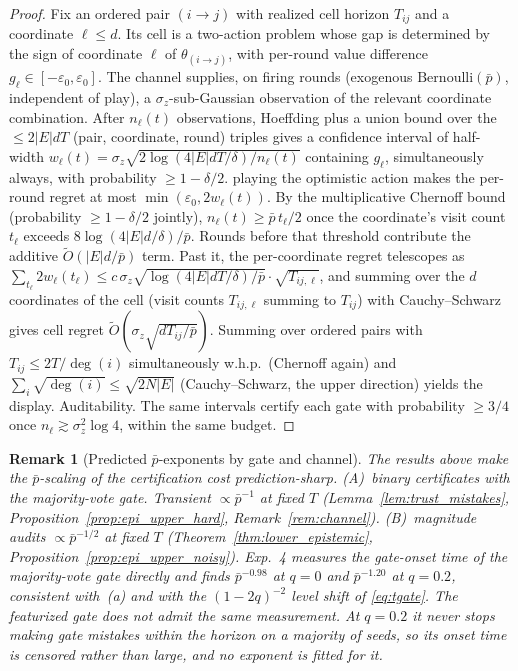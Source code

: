 \documentclass[11pt]{article}
\newtheorem{remark}[theorem]{Remark}
\newcommand{\Ot}{\widetilde{O}}
\begin{document}
\begin{proof}
Fix an ordered pair $(i\to j)$ with realized cell horizon $T_{ij}$ and
a coordinate $\ell\leq d$. Its cell is a two-action problem whose gap
is determined by the sign of coordinate $\ell$ of
$\theta_{(i\to j)}$, with per-round value difference
$g_\ell\in[-\varepsilon_0,\varepsilon_0]$.  The channel supplies, on
firing rounds (exogenous $\mathrm{Bernoulli}(\bar p)$, independent of
play), a $\sigma_z$-sub-Gaussian observation of the relevant
coordinate combination.  After $n_\ell(t)$ observations, Hoeffding
plus a union bound over the $\leq 2|E|dT$ (pair, coordinate, round)
triples gives a confidence interval of half-width
$w_\ell(t)=\sigma_z\sqrt{2\log(4|E|dT/\delta)/n_\ell(t)}$ containing
$g_\ell$, simultaneously always, with probability $\geq1-\delta/2$.
playing the optimistic action makes the per-round regret at most
$\min(\varepsilon_0,2w_\ell(t))$.  By the multiplicative
Chernoff bound (probability $\geq1-\delta/2$ jointly), $n_\ell(t)\geq
\bar p\,t_\ell/2$ once the coordinate's visit count $t_\ell$ exceeds
$8\log(4|E|d/\delta)/\bar p$. Rounds before that threshold contribute
the additive $\Ot(|E|d/\bar p)$ term.  Past it, the per-coordinate
regret telescopes as
$\sum_{t_\ell}2w_\ell(t_\ell)\leq
c\,\sigma_z\sqrt{\log(4|E|dT/\delta)/\bar p}\cdot\sqrt{T_{ij,\ell}}$,
and summing over the $d$ coordinates of the cell (visit counts
$T_{ij,\ell}$ summing to $T_{ij}$) with Cauchy--Schwarz gives cell
regret $\Ot(\sigma_z\sqrt{dT_{ij}/\bar p})$.  Summing over ordered
pairs with $T_{ij}\leq 2T/\deg(i)$ simultaneously w.h.p.\ (Chernoff
again) and $\sum_i\sqrt{\deg(i)}\leq\sqrt{2N|E|}$ (Cauchy--Schwarz,
the upper direction) yields the display.  Auditability. The same
intervals certify each gate with probability $\geq3/4$ once
$n_\ell\gtrsim\sigma_z^2\log 4$, within the same budget.
\end{proof}

\begin{remark}[Predicted $\bar p$-exponents by gate and channel]
\label{rem:noisy_exponent}
The results above make the $\bar p$-scaling of the certification cost
prediction-sharp. (A)~binary certificates with the majority-vote gate. Transient
$\propto\bar p^{-1}$ at fixed $T$
(Lemma~\ref{lem:trust_mistakes},
Proposition~\ref{prop:epi_upper_hard}, Remark~\ref{rem:channel}). (B)~magnitude audits $\propto\bar p^{-1/2}$ at fixed $T$
(Theorem~\ref{thm:lower_epistemic},
Proposition~\ref{prop:epi_upper_noisy}).  Exp.~4 measures the
gate-onset time of the majority-vote gate directly and finds
$\bar p^{-0.98}$ at $q=0$ and $\bar p^{-1.20}$ at $q=0.2$, consistent
with~(a) and with the $(1-2q)^{-2}$ level shift of
\eqref{eq:tgate}.  The featurized gate does not admit the same
measurement. At $q=0.2$ it never stops making gate mistakes within
the horizon on a majority of seeds, so its onset time is censored
rather than large, and no exponent is fitted for it.
\end{remark}
\end{document}
